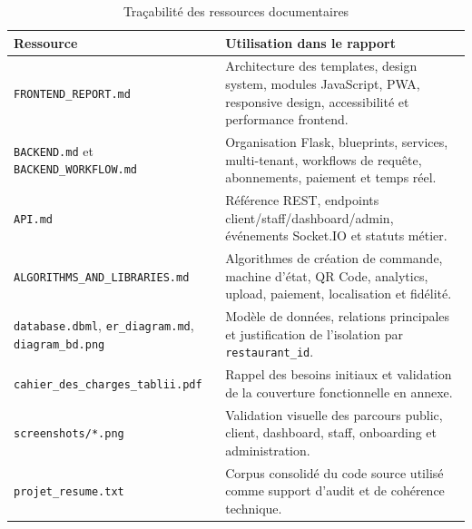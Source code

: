 \documentclass[12pt,a4paper]{report}
\newcommand{\resourcepath}[1]{\texttt{\footnotesize #1}}
\begin{document}
\begin{table}[H]
    \centering
    \begin{tabularx}{\textwidth}{>{\RaggedRight\arraybackslash}p{4.2cm} X}
        \toprule
        \rowcolor{secondary!10}
        \textbf{Ressource} & \textbf{Utilisation dans le rapport} \\
        \midrule
        \resourcepath{FRONTEND\_REPORT.md} & Architecture des templates, design system, modules JavaScript, PWA, responsive design, accessibilit\'e et performance frontend. \\
        \resourcepath{BACKEND.md} et \resourcepath{BACKEND\_WORKFLOW.md} & Organisation Flask, blueprints, services, multi-tenant, workflows de requ\^ete, abonnements, paiement et temps r\'eel. \\
        \resourcepath{API.md} & R\'ef\'erence REST, endpoints client/staff/dashboard/admin, \'ev\'enements Socket.IO et statuts m\'etier. \\
        \resourcepath{ALGORITHMS\_AND\_LIBRARIES.md} & Algorithmes de cr\'eation de commande, machine d'\'etat, QR Code, analytics, upload, paiement, localisation et fid\'elit\'e. \\
        \resourcepath{database.dbml}, \resourcepath{er\_diagram.md}, \resourcepath{diagram\_bd.png} & Mod\`ele de donn\'ees, relations principales et justification de l'isolation par \texttt{restaurant\_id}. \\
        \resourcepath{cahier\_des\_charges\_tablii.pdf} & Rappel des besoins initiaux et validation de la couverture fonctionnelle en annexe. \\
        \resourcepath{screenshots/*.png} & Validation visuelle des parcours public, client, dashboard, staff, onboarding et administration. \\
        \resourcepath{projet\_resume.txt} & Corpus consolid\'e du code source utilis\'e comme support d'audit et de coh\'erence technique. \\
    \bottomrule
    \end{tabularx}
    \caption{Tra\c{c}abilit\'e des ressources documentaires}
    \label{tab:resource-map}
\end{table}
\end{document}
